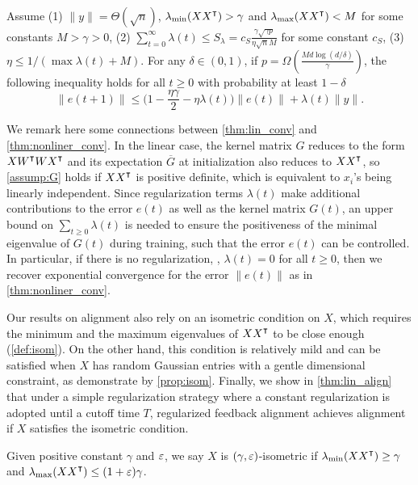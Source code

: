 \begin{theorem}
\label{thm:lin_conv}
Assume \textnormal{(1)}  $\|y\| = \Theta(\sqrt n)$, $\lambda_{\min}(XX\transpose)>\gamma$ and $\lambda_{\max}(XX\transpose)<M$ for some constants $M>\gamma>0$, \textnormal{(2)} $\sum_{t=0}^\infty \lambda(t) \leq  S_\lambda = c_{S}\frac{\gamma\sqrt{\gamma p}}{\eta\sqrt{n}M}$ for some constant $c_{S}$, \textnormal{(3)} $\eta \leq 1/(\max \lambda(t)+M)$.
For any $\delta\in(0,1)$, if $p = \Omega(\frac{Md\log(d/\delta)}{\gamma})$, the following inequality holds for all $t\geq 0$ with probability at least $1-\delta$
\begin{equation}
\label{eq:reg_error_bd}
\|e(t+1)\|\leq \big(1-\frac{\eta\gamma}{2}-\eta\lambda(t)\big)\|e(t)\| + \lambda(t)\|y\|.
\end{equation} 
\end{theorem}

We remark here some connections between \cref{thm:lin_conv} and \cref{thm:nonliner_conv}. In the linear case, the kernel matrix $G$ reduces to the form $X W\transpose W X\transpose$ and its expectation $\overline{G}$ at initialization also reduces to $X X\transpose$, so \cref{assump:G} holds if $XX\transpose$ is positive definite, which is equivalent to $x_i$'s being linearly independent. Since regularization terms $\lambda(t)$ make additional contributions to the error $e(t)$ as well as the kernel matrix $G(t)$, an upper bound on $\sum_{t\geq 0}\lambda(t)$ is needed to ensure the positiveness of the minimal eigenvalue of $G(t)$ during training, such that the error $e(t)$ can be controlled. In particular, if there is no regularization, \ie, $\lambda(t)=0$ for all $t\geq 0$, then we recover exponential convergence for the error $\|e(t)\|$ as in \cref{thm:nonliner_conv}.

Our results on alignment also rely on an isometric condition on $X$, which requires the minimum and the maximum eigenvalues of $XX\transpose$ to be close enough (\cf \cref{def:isom}). On the other hand, this condition is relatively mild and can be satisfied when $X$ has random Gaussian entries with a gentle dimensional constraint, as demonstrate by \cref{prop:isom}. Finally, we show in \cref{thm:lin_align} that under a simple regularization strategy where a constant regularization is adopted until a cutoff time $T$, regularized feedback alignment achieves alignment if $X$ satisfies the isometric condition.
{}
\begin{definition}
\label{def:isom}
Given positive constant $\gamma$ and $\varepsilon$, we say $X$ is $(\gamma, \varepsilon)$-isometric if 
$\lambda_{\min}(XX\transpose)\geq\gamma$ and $\lambda_{\max}(XX\transpose)\leq(1+\eps)\gamma$.
\end{definition}

